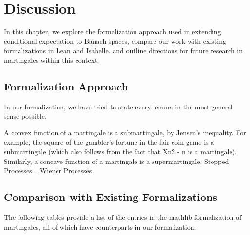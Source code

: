 
\chapter{Discussion}\label{chapter:discussion}

In this chapter, we explore the formalization approach used in extending conditional expectation to Banach spaces, compare our work with existing formalizations in Lean and Isabelle, and outline directions for future research in martingales within this context.

\section{Formalization Approach}

In our formalization, we have tried to state every lemma in the most general sense possible. 

A convex function of a martingale is a submartingale, by Jensen's inequality. For example, the square of the gambler's fortune in the fair coin game is a submartingale (which also follows from the fact that Xn2 - n is a martingale). Similarly, a concave function of a martingale is a supermartingale. Stopped Processes... Wiener Processes

\section{Comparison with Existing Formalizations}

The following tables provide a list of the entries in the \textsf{mathlib} formalization of martingales, all of which have counterparts in our formalization.

